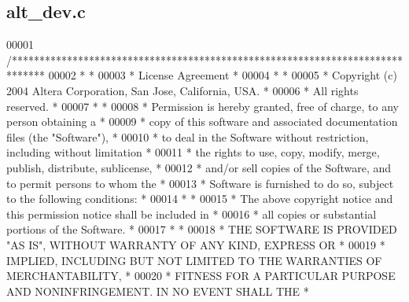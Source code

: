 \subsection{alt\+\_\+dev.\+c}
\label{alt__dev_8c_source}

\begin{DoxyCode}
00001 \textcolor{comment}{/******************************************************************************}
00002 \textcolor{comment}{*                                                                             *}
00003 \textcolor{comment}{* License Agreement                                                           *}
00004 \textcolor{comment}{*                                                                             *}
00005 \textcolor{comment}{* Copyright (c) 2004 Altera Corporation, San Jose, California, USA.           *}
00006 \textcolor{comment}{* All rights reserved.                                                        *}
00007 \textcolor{comment}{*                                                                             *}
00008 \textcolor{comment}{* Permission is hereby granted, free of charge, to any person obtaining a     *}
00009 \textcolor{comment}{* copy of this software and associated documentation files (the "Software"),  *}
00010 \textcolor{comment}{* to deal in the Software without restriction, including without limitation   *}
00011 \textcolor{comment}{* the rights to use, copy, modify, merge, publish, distribute, sublicense,    *}
00012 \textcolor{comment}{* and/or sell copies of the Software, and to permit persons to whom the       *}
00013 \textcolor{comment}{* Software is furnished to do so, subject to the following conditions:        *}
00014 \textcolor{comment}{*                                                                             *}
00015 \textcolor{comment}{* The above copyright notice and this permission notice shall be included in  *}
00016 \textcolor{comment}{* all copies or substantial portions of the Software.                         *}
00017 \textcolor{comment}{*                                                                             *}
00018 \textcolor{comment}{* THE SOFTWARE IS PROVIDED "AS IS", WITHOUT WARRANTY OF ANY KIND, EXPRESS OR  *}
00019 \textcolor{comment}{* IMPLIED, INCLUDING BUT NOT LIMITED TO THE WARRANTIES OF MERCHANTABILITY,    *}
00020 \textcolor{comment}{* FITNESS FOR A PARTICULAR PURPOSE AND NONINFRINGEMENT. IN NO EVENT SHALL THE *}

\end{DoxyCode}
